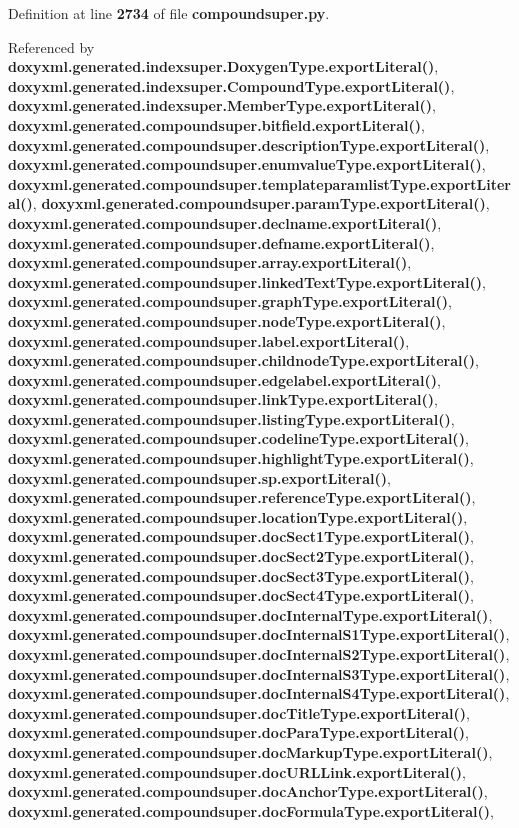 Definition at line {\bf 2734} of file {\bf compoundsuper.\+py}.



Referenced by {\bf doxyxml.\+generated.\+indexsuper.\+Doxygen\+Type.\+export\+Literal()}, {\bf doxyxml.\+generated.\+indexsuper.\+Compound\+Type.\+export\+Literal()}, {\bf doxyxml.\+generated.\+indexsuper.\+Member\+Type.\+export\+Literal()}, {\bf doxyxml.\+generated.\+compoundsuper.\+bitfield.\+export\+Literal()}, {\bf doxyxml.\+generated.\+compoundsuper.\+description\+Type.\+export\+Literal()}, {\bf doxyxml.\+generated.\+compoundsuper.\+enumvalue\+Type.\+export\+Literal()}, {\bf doxyxml.\+generated.\+compoundsuper.\+templateparamlist\+Type.\+export\+Literal()}, {\bf doxyxml.\+generated.\+compoundsuper.\+param\+Type.\+export\+Literal()}, {\bf doxyxml.\+generated.\+compoundsuper.\+declname.\+export\+Literal()}, {\bf doxyxml.\+generated.\+compoundsuper.\+defname.\+export\+Literal()}, {\bf doxyxml.\+generated.\+compoundsuper.\+array.\+export\+Literal()}, {\bf doxyxml.\+generated.\+compoundsuper.\+linked\+Text\+Type.\+export\+Literal()}, {\bf doxyxml.\+generated.\+compoundsuper.\+graph\+Type.\+export\+Literal()}, {\bf doxyxml.\+generated.\+compoundsuper.\+node\+Type.\+export\+Literal()}, {\bf doxyxml.\+generated.\+compoundsuper.\+label.\+export\+Literal()}, {\bf doxyxml.\+generated.\+compoundsuper.\+childnode\+Type.\+export\+Literal()}, {\bf doxyxml.\+generated.\+compoundsuper.\+edgelabel.\+export\+Literal()}, {\bf doxyxml.\+generated.\+compoundsuper.\+link\+Type.\+export\+Literal()}, {\bf doxyxml.\+generated.\+compoundsuper.\+listing\+Type.\+export\+Literal()}, {\bf doxyxml.\+generated.\+compoundsuper.\+codeline\+Type.\+export\+Literal()}, {\bf doxyxml.\+generated.\+compoundsuper.\+highlight\+Type.\+export\+Literal()}, {\bf doxyxml.\+generated.\+compoundsuper.\+sp.\+export\+Literal()}, {\bf doxyxml.\+generated.\+compoundsuper.\+reference\+Type.\+export\+Literal()}, {\bf doxyxml.\+generated.\+compoundsuper.\+location\+Type.\+export\+Literal()}, {\bf doxyxml.\+generated.\+compoundsuper.\+doc\+Sect1\+Type.\+export\+Literal()}, {\bf doxyxml.\+generated.\+compoundsuper.\+doc\+Sect2\+Type.\+export\+Literal()}, {\bf doxyxml.\+generated.\+compoundsuper.\+doc\+Sect3\+Type.\+export\+Literal()}, {\bf doxyxml.\+generated.\+compoundsuper.\+doc\+Sect4\+Type.\+export\+Literal()}, {\bf doxyxml.\+generated.\+compoundsuper.\+doc\+Internal\+Type.\+export\+Literal()}, {\bf doxyxml.\+generated.\+compoundsuper.\+doc\+Internal\+S1\+Type.\+export\+Literal()}, {\bf doxyxml.\+generated.\+compoundsuper.\+doc\+Internal\+S2\+Type.\+export\+Literal()}, {\bf doxyxml.\+generated.\+compoundsuper.\+doc\+Internal\+S3\+Type.\+export\+Literal()}, {\bf doxyxml.\+generated.\+compoundsuper.\+doc\+Internal\+S4\+Type.\+export\+Literal()}, {\bf doxyxml.\+generated.\+compoundsuper.\+doc\+Title\+Type.\+export\+Literal()}, {\bf doxyxml.\+generated.\+compoundsuper.\+doc\+Para\+Type.\+export\+Literal()}, {\bf doxyxml.\+generated.\+compoundsuper.\+doc\+Markup\+Type.\+export\+Literal()}, {\bf doxyxml.\+generated.\+compoundsuper.\+doc\+U\+R\+L\+Link.\+export\+Literal()}, {\bf doxyxml.\+generated.\+compoundsuper.\+doc\+Anchor\+Type.\+export\+Literal()}, {\bf doxyxml.\+generated.\+compoundsuper.\+doc\+Formula\+Type.\+export\+Literal()}, 